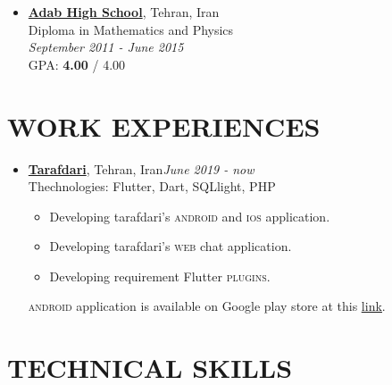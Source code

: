 \documentclass[margin]{res}
\begin{document}
\begin{resume}
\begin{itemize}
\item \textbf{\href{http://adab.sch.ir/HSchool}{Adab High School}}, Tehran, Iran\\
Diploma in Mathematics and Physics \\ \textit{September 2011 - June 2015}\\
GPA: \textbf{4.00} / 4.00

\end{itemize}



\section{WORK EXPERIENCES}
	
\begin{itemize} \itemsep -5pt

\item \textbf{\href{https://tarafdari.com}{Tarafdari}}, Tehran, Iran\hfill \textsl{June 2019 - now}\\
Thechnologies: Flutter, Dart, SQLlight, PHP 
\begin{itemize}
\item Developing tarafdari's \textsc{android} and \textsc{ios} application.
\item Developing tarafdari's \textsc{web} chat application.
\item Developing requirement Flutter \textsc{plugins}.
\end{itemize}
\textsc{android} application is available on Google play store at this
\href{https://play.google.com/store/apps/details?id=com.tarafdari.news}{\underline{link}}.


\end{itemize}



\section{TECHNICAL SKILLS}
	

\end{resume}
\end{document}

